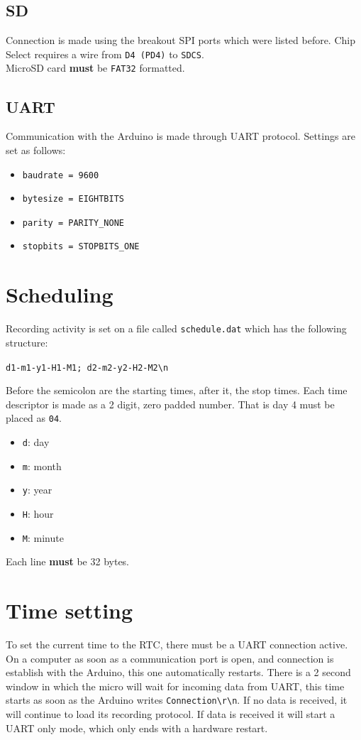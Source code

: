 \documentclass[10pt, letterpaper]{article} %
\begin{document}
	\subsection{SD}
		Connection is made using the breakout SPI ports which were listed before. Chip Select requires a wire from \verb|D4 (PD4)| to \verb|SDCS|.\\
		
		MicroSD card \textbf{must} be \verb|FAT32| formatted.
	
	\subsection{UART}
		Communication with the Arduino is made through UART protocol. Settings are set as follows:
		\begin{itemize}
			\item \verb|baudrate = 9600|
			\item \verb|bytesize = EIGHTBITS|
			\item \verb|parity = PARITY_NONE|
			\item \verb|stopbits = STOPBITS_ONE|
		\end{itemize}

\newpage
\section{Scheduling}
	Recording activity is set on a file called \verb|schedule.dat| which has the following structure:
	\begin{center}
		\verb|d1-m1-y1-H1-M1; d2-m2-y2-H2-M2\n|
	\end{center}
	
	Before the semicolon are the starting times, after it, the stop times. Each time descriptor is made as a 2 digit, zero padded number. That is day 4 must be placed as \verb|04|.
	\begin{itemize}
		\item \verb|d|: day
		\item \verb|m|: month
		\item \verb|y|: year
		\item \verb|H|: hour
		\item \verb|M|: minute
	\end{itemize}
	
	Each line \textbf{must} be 32 bytes.

\section{Time setting}
	To set the current time to the RTC, there must be a UART connection active. On a computer as soon as a communication port is open, and connection is establish with the Arduino, this one automatically restarts. There is a 2 second window in which the micro will wait for incoming data from UART, this time starts as soon as the Arduino writes \verb|Connection\r\n|. If no data is received, it will continue to load its recording protocol. If data is received it will start a UART only mode, which only ends with a hardware restart.\\
	
\end{document}
